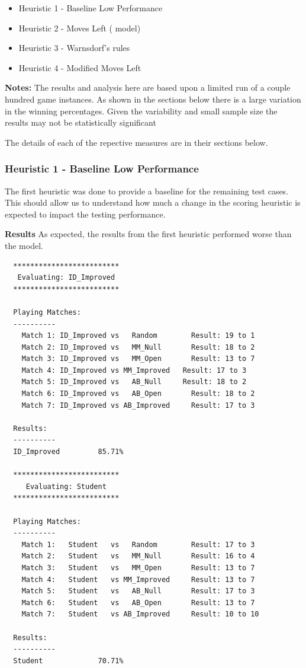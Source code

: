 \documentclass{article}
\begin{document}
\begin{itemize}
  \item Heuristic 1 - Baseline Low Performance
  \item Heuristic 2 - Moves Left (\texttt{} model)
  \item Heuristic 3 - Warnsdorf's rules
  \item Heuristic 4 - Modified Moves Left
\end{itemize}

\textbf{Notes:} The results and analysis here are based upon a limited run of a couple hundred game instances. As shown in the sections below
there is a large variation in the winning percentages. Given the variability and small sample size the results may not be statistically significant


The details of each of the repective measures are in their sections below.
\subsubsection{Heuristic 1 - Baseline Low Performance}

The first heuristic was done to provide a baseline for the remaining test cases. This should allow us to
understand how much a change in the scoring heuristic is expected to impact the testing performance.\newline

\textbf{Results}\newline
As expected, the results from the first heuristic performed worse than the \texttt{} model.

\begin{verbatim}
  *************************
   Evaluating: ID_Improved
  *************************

  Playing Matches:
  ----------
    Match 1: ID_Improved vs   Random    	Result: 19 to 1
    Match 2: ID_Improved vs   MM_Null   	Result: 18 to 2
    Match 3: ID_Improved vs   MM_Open   	Result: 13 to 7
    Match 4: ID_Improved vs MM_Improved   Result: 17 to 3
    Match 5: ID_Improved vs   AB_Null     Result: 18 to 2
    Match 6: ID_Improved vs   AB_Open   	Result: 18 to 2
    Match 7: ID_Improved vs AB_Improved 	Result: 17 to 3

  Results:
  ----------
  ID_Improved         85.71%

  *************************
     Evaluating: Student
  *************************

  Playing Matches:
  ----------
    Match 1:   Student   vs   Random    	Result: 17 to 3
    Match 2:   Student   vs   MM_Null   	Result: 16 to 4
    Match 3:   Student   vs   MM_Open   	Result: 13 to 7
    Match 4:   Student   vs MM_Improved 	Result: 13 to 7
    Match 5:   Student   vs   AB_Null   	Result: 17 to 3
    Match 6:   Student   vs   AB_Open   	Result: 13 to 7
    Match 7:   Student   vs AB_Improved 	Result: 10 to 10

  Results:
  ----------
  Student             70.71%
\end{verbatim}
\end{document}
